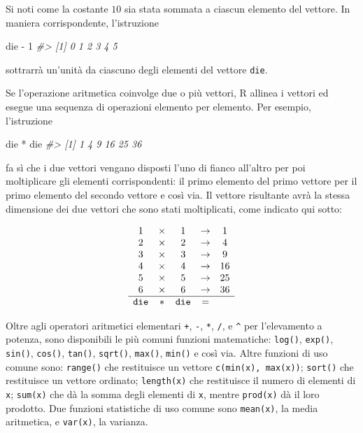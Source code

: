 \documentclass[
  11pt,
]{krantz}
\makeatletter
\newenvironment{Shaded}{\begin{snugshade}}{\end{snugshade}}
\newcommand{\CommentTok}[1]{\textcolor[rgb]{0.37,0.37,0.37}{\textit{#1}}}
\newcommand{\DecValTok}[1]{\textcolor[rgb]{0.06,0.06,0.06}{#1}}
\newcommand{\NormalTok}[1]{#1}
\newcommand{\SpecialCharTok}[1]{\textcolor[rgb]{0,0,0}{#1}}
\newenvironment{kframe}{%
\medskip{}
\setlength{\fboxsep}{.8em}
 \def\at@end@of@kframe{}%
 \ifinner\ifhmode%
  \def\at@end@of@kframe{\end{minipage}}%
  \begin{minipage}{\columnwidth}%
 \fi\fi%
 \def\FrameCommand##1{\hskip\@totalleftmargin \hskip-\fboxsep
 \colorbox{shadecolor}{##1}\hskip-\fboxsep
     \hskip-\linewidth \hskip-\@totalleftmargin \hskip\columnwidth}%
 \MakeFramed {\advance\hsize-\width
   \@totalleftmargin\z@ \linewidth\hsize
   \@setminipage}}%
 {\par\unskip\endMakeFramed%
 \at@end@of@kframe}
\renewenvironment{Shaded}{\begin{kframe}}{\end{kframe}}
\theoremstyle{definition}
\theoremstyle{definition}
\theoremstyle{definition}
\theoremstyle{definition}
\theoremstyle{remark}
\makeatother
\begin{document}
Si noti come la costante \(10\) sia stata sommata a ciascun elemento del vettore. In maniera corrispondente, l'istruzione

\begin{Shaded}
\begin{Highlighting}[]
\NormalTok{die }\SpecialCharTok{{-}} \DecValTok{1}
\CommentTok{\#\textgreater{} [1] 0 1 2 3 4 5}
\end{Highlighting}
\end{Shaded}

sottrarrà un'unità da ciascuno degli elementi del vettore \texttt{die}.

Se l'operazione aritmetica coinvolge due o più vettori, R allinea i vettori ed esegue una sequenza di operazioni elemento per elemento. Per esempio, l'istruzione

\begin{Shaded}
\begin{Highlighting}[]
\NormalTok{die }\SpecialCharTok{*}\NormalTok{ die}
\CommentTok{\#\textgreater{} [1]  1  4  9 16 25 36}
\end{Highlighting}
\end{Shaded}

fa sì che i due vettori vengano disposti l'uno di fianco all'altro per poi moltiplicare gli elementi corrispondenti: il primo elemento del primo vettore per il primo elemento del secondo vettore e così via. Il vettore risultante avrà la stessa dimensione dei due vettori che sono stati moltiplicati, come indicato qui sotto:

\[
\begin{array}{ccccc}
1 & \times & 1 & \to & 1 \\
2 & \times & 2 & \to & 4 \\
3 & \times & 3 & \to & 9 \\
4 & \times & 4 & \to & 16 \\
5 & \times & 5 & \to & 25 \\
6 & \times & 6 & \to & 36 \\
\hline
\verb+die+ & * & \verb+die+ & = & 
\end{array}
\]

Oltre agli operatori aritmetici elementari \texttt{+}, \texttt{-}, \texttt{*}, \texttt{/}, e \texttt{\^{}} per l'elevamento a potenza, sono disponibili le più comuni funzioni matematiche: \texttt{log()}, \texttt{exp()}, \texttt{sin()}, \texttt{cos()}, \texttt{tan()}, \texttt{sqrt()}, \texttt{max()}, \texttt{min()} e così via. Altre funzioni di uso comune sono: \texttt{range()} che restituisce un vettore \texttt{c(min(x),\ max(x))}; \texttt{sort()} che restituisce un vettore ordinato; \texttt{length(x)} che restituisce il numero di elementi di \texttt{x}; \texttt{sum(x)} che dà la somma degli elementi di \texttt{x}, mentre \texttt{prod(x)} dà il loro prodotto. Due funzioni statistiche di uso comune sono \texttt{mean(x)}, la media aritmetica, e \texttt{var(x)}, la varianza.
\end{document}
